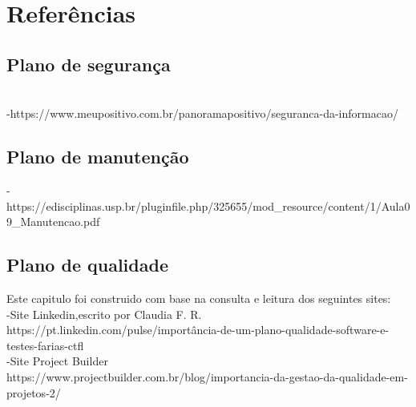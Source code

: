 \chapter{Referências}
\label{referencias}
\section{Plano de segurança}
\\
-https://www.meupositivo.com.br/panoramapositivo/seguranca-da-informacao/ \\

\section{Plano de manutenção}
-https://edisciplinas.usp.br/pluginfile.php/325655/mod_resource/content/1/Aula09_Manutencao.pdf\\
\section{Plano de qualidade}
Este capitulo foi construido com base na consulta e leitura dos seguintes sites:\\
-Site Linkedin,escrito por Claudia F. R. \\
https://pt.linkedin.com/pulse/importância-de-um-plano-qualidade-software-e-testes-farias-ctfl \\
-Site Project Builder\\
https://www.projectbuilder.com.br/blog/importancia-da-gestao-da-qualidade-em-projetos-2/